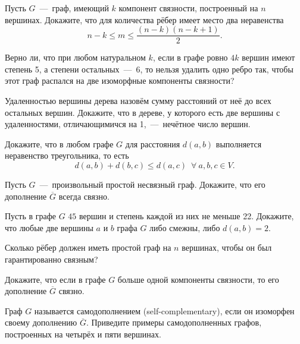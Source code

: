 \begin{exersize}
	Пусть $G$~---~граф, имеющий $k$ компонент связности, построенный на $n$ вершинах. Докажите, что для количества рёбер имеет место два неравенства $$n-k \leqslant m \leqslant \frac{(n-k)(n-k+1)}{2}.$$
\end{exersize}

\begin{exersize}
	Верно ли, что при любом натуральном $k$, если в графе ровно $4k$ вершин имеют степень 5, а степени остальных~---~6, то нельзя удалить одно ребро так, чтобы этот граф распался на две изоморфные компоненты связности?
\end{exersize}

\begin{exersize}
	Удаленностью вершины дерева назовём сумму расстояний от неё до всех остальных вершин. Докажите, что в дереве, у которого есть две вершины с удаленностями, отличающимичся на 1,~---~нечётное число вершин.
\end{exersize}	

\begin{exersize}
	Докажите, что в любом графе $G$ для расстояния $d(a, b)$ выполняется неравенство треугольника, то есть 
	$$d(a, b) + d(b, c) \leqslant d(a,c) \;\ \forall \!\ a, b, c \in V.$$
\end{exersize}	

\begin{exersize}
	Пусть $G$~---~произвольный простой несвязный граф. Докажите, что его дополнение $\overline{G}$ всегда связно.
\end{exersize}	

\begin{exersize}
	Пусть в графе $G$ $45$ вершин и степень каждой из них не меньше 22. Докажите, что любые две вершины $a$ и $b$ графа $G$ либо смежны, либо $d (a, b) = 2$. 
\end{exersize}	

\begin{exersize}
	Сколько рёбер должен иметь простой граф на $n$ вершинах, чтобы он был гарантированно связным?
\end{exersize}

\begin{exersize}
	Докажите, что если в графе $G$ больше одной компоненты связности, то его дополнение $\overline{G}$ связно.
\end{exersize}

\begin{exersize}
	Граф $G$ называется самодополнением (self-complementary), если он изоморфен своему дополнению $\overline{G}$. Приведите примеры самодополненных графов, построенных на четырёх и пяти вершинах.
\end{exersize}

